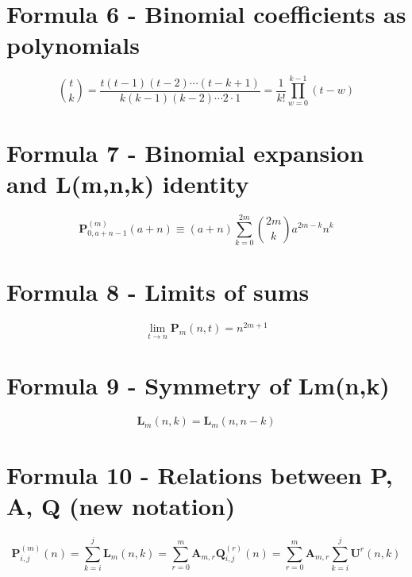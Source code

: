 \documentclass[12pt, letterpaper]{amsart}
\theoremstyle{definition}
\theoremstyle{remark}
\numberwithin{equation}{section}
\begin{document}
\section{Formula 6 - Binomial coefficients as polynomials}
\begin{equation*}
\binom{t}{k}=\frac{t(t-1)(t-2)\cdots(t-k+1)}{k(k-1)(k-2)\cdots 2\cdot 1}=\frac{1}{k!}\prod_{w=0}^{k-1}(t-w)
\end{equation*}
\section{Formula 7 - Binomial expansion and L(m,n,k) identity}
\begin{equation*}
\mathbf{P}^{(m)}_{0,a+n-1}(a+n) \equiv (a+n)\sum_{k=0}^{2m}\binom{2m}{k}a^{2m-k}n^k
\end{equation*}
\section{Formula 8 - Limits of sums}
\begin{equation*}
\lim\limits_{t\to n} \mathbf{P}_m(n,t) = n^{2m+1}
\end{equation*}
\section{Formula 9 - Symmetry of Lm(n,k)}
\begin{equation*}
\mathbf{L}_m(n,k)=\mathbf{L}_m(n,n-k)
\end{equation*}
\section{Formula 10 - Relations between P, A, Q (new notation)}
\begin{equation*}
\mathbf{P}^{(m)}_{i,j}(n)
=\sum\limits_{k=i}^{j}\mathbf{L}_m(n,k)
=\sum\limits_{r=0}^{m}\mathbf{A}_{m,r}\mathbf{Q}^{(r)}_{i,j}(n)
=\sum\limits_{r=0}^{m}\mathbf{A}_{m,r}\sum\limits_{k=i}^{j}\mathbf{U}^r(n,k)
\end{equation*}
\end{document}
